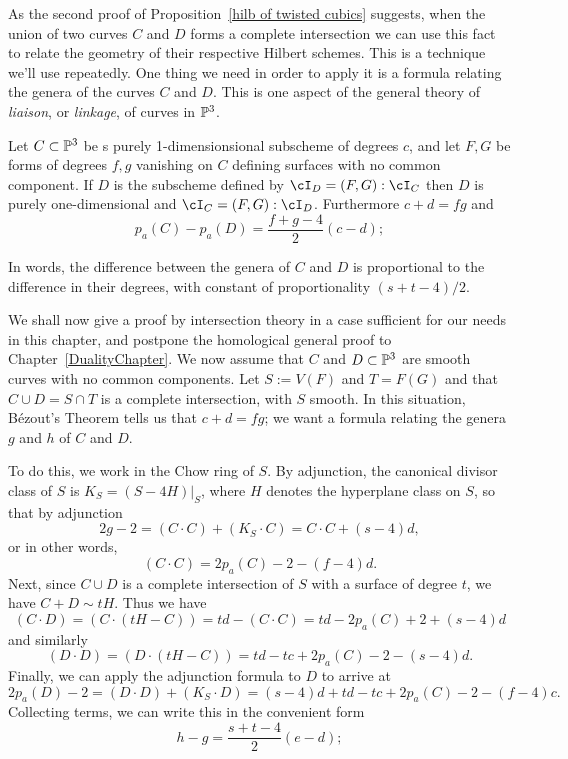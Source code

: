 As the second proof of Proposition~\ref{hilb of twisted cubics} suggests, when the union of two curves $C$ and $D$ forms a complete intersection we can use this fact to relate the geometry of their respective Hilbert schemes. This is a technique we'll use repeatedly. One thing we need in order to apply it is a formula relating the genera of the curves $C$ and $D$. This is one aspect of the general theory of \emph{liaison}, or \emph{linkage}, of curves in $\PP^3$.
\begin{theorem}
 Let $C\subset \PP^3$ be s purely 1-dimensionsional subscheme of degrees $c$, and let $F,G$ be forms of degrees $f,g$ vanishing on  $C$ defining surfaces with no common component. If $D$ is the subscheme defined by $\cI_D = (F,G):\cI_C$ then $D$ is purely one-dimensional and
 $\cI_C = (F,G):\cI_D$. Furthermore $c+d = fg$ and 
 \begin{equation}\label{linked genus formula}
p_a(C) - p_a(D) = \frac{f+g-4}{2}(c-d);
\end{equation}
\end{theorem}
In words, the difference between the genera of $C$ and $D$ is proportional to the difference in their degrees, with constant of proportionality $(s+t-4)/2$.

We shall now give a proof by intersection theory in a case sufficient for our needs in this chapter, and postpone the homological general proof to  Chapter~\ref{DualityChapter}.
We now assume that $C$ and $D \subset \PP^3$ are smooth curves with no common components. Let $S := V(F)$ and $T = F(G)$ and that $C \cup D = S\cap T$ is a complete intersection, with $S$ smooth. In this situation, B\'ezout's Theorem tells us that $c+d = fg$; we want a formula relating the genera $g$ and $h$ of $C$ and $D$.

To do this, we work in the Chow ring of $S$. By adjunction, the canonical divisor class of $S$ is $K_S = (S - 4H)|_S$, where $H$ denotes the hyperplane class on $S$, so that by adjunction 
$$
2g-2 = (C\cdot C) + (K_S\cdot C) = C\cdot C + (s-4)d, 
$$
or in other words,
$$
(C \cdot C) = 2p_a(C)-2 - (f-4)d.
$$
Next, since $C \cup D$ is a complete intersection of $S$ with a surface of degree $t$, we have $C + D\sim tH$. Thus we have
$$
(C \cdot D) = (C \cdot (tH - C)) = td - (C \cdot C) = td - 2p_a(C) + 2 + (s-4)d
$$
and similarly
$$
(D \cdot D) = (D \cdot (tH - C)) = td - tc + 2p_a(C) - 2 - (s-4)d.
$$
Finally, we can apply the adjunction formula to $D$ to arrive at
$$
2p_a(D) - 2 = (D \cdot D) + (K_S \cdot D) = (s-4)d  + td - tc + 2p_a(C) - 2 - (f-4)c.
$$
Collecting terms, we can write this in the convenient form
\begin{equation}\label{linked genus formula}
h - g = \frac{s+t-4}{2}(e-d);
\end{equation}
 

